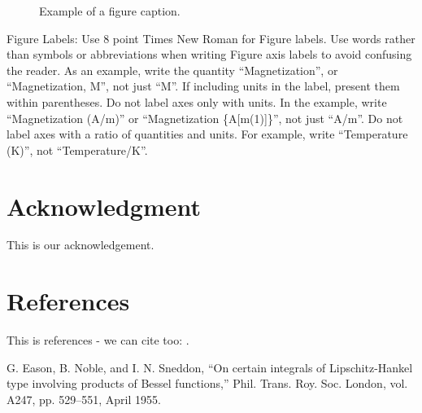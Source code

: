 \documentclass[conference]{IEEEtran}
\begin{document}
\begin{figure}[htbp]
\centerline{
}
\caption{Example of a figure caption.}
\label{fig}
\end{figure}

Figure Labels: Use 8 point Times New Roman for Figure labels. Use words 
rather than symbols or abbreviations when writing Figure axis labels to 
avoid confusing the reader. As an example, write the quantity 
``Magnetization'', or ``Magnetization, M'', not just ``M''. If including 
units in the label, present them within parentheses. Do not label axes only 
with units. In the example, write ``Magnetization (A/m)'' or ``Magnetization 
\{A[m(1)]\}'', not just ``A/m''. Do not label axes with a ratio of 
quantities and units. For example, write ``Temperature (K)'', not 
``Temperature/K''.

\section*{Acknowledgment}

This is our acknowledgement.

\section*{References}

This is references - we can cite too: \cite{b1}.

\begin{thebibliography}{00}
 G. Eason, B. Noble, and I. N. Sneddon, ``On certain integrals of Lipschitz-Hankel type involving products of Bessel functions,'' Phil. Trans. Roy. Soc. London, vol. A247, pp. 529--551, April 1955.
\end{thebibliography}
\end{document}
